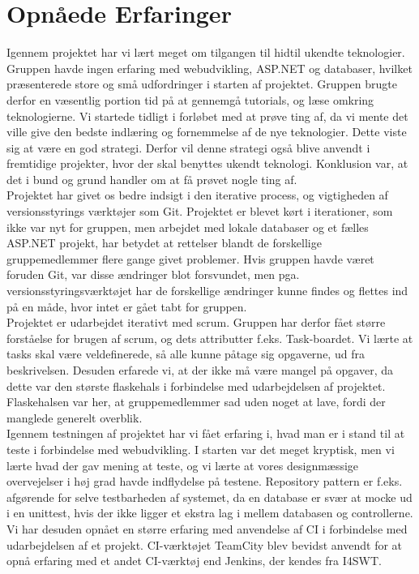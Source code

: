 \chapter{Opnåede Erfaringer}

Igennem projektet har vi lært meget om tilgangen til hidtil ukendte teknologier. Gruppen havde ingen erfaring med webudvikling, ASP.NET og databaser, hvilket præsenterede store og små udfordringer i starten af projektet. Gruppen brugte derfor en væsentlig portion tid på at gennemgå tutorials, og læse omkring teknologierne. Vi startede tidligt i forløbet med at prøve ting af, da vi mente det ville give den bedste indlæring og fornemmelse af de nye teknologier. Dette viste sig at være en god strategi. Derfor vil denne strategi også blive anvendt i fremtidige projekter, hvor der skal benyttes ukendt teknologi. Konklusion var, at det i bund og grund handler om at få prøvet nogle ting af.\\


\noindent Projektet har givet os bedre indsigt i den iterative process, og vigtigheden af versionsstyrings værktøjer som Git. Projektet er blevet kørt i iterationer, som ikke var nyt for gruppen, men arbejdet med lokale databaser og et fælles ASP.NET projekt, har betydet at rettelser blandt de forskellige gruppemedlemmer flere gange givet problemer. Hvis gruppen havde været foruden Git, var disse ændringer blot forsvundet, men pga. versionsstyringsværktøjet har de forskellige ændringer kunne findes og flettes ind på en måde, hvor intet er gået tabt for gruppen. \\

\noindent Projektet er udarbejdet iterativt med scrum. Gruppen har derfor fået større forståelse for brugen af scrum, og dets attributter f.eks. Task-boardet. Vi lærte at tasks skal være veldefinerede, så alle kunne påtage sig opgaverne, ud fra beskrivelsen. Desuden erfarede vi, at der ikke må være mangel på opgaver, da dette var den største flaskehals i forbindelse med udarbejdelsen af projektet. Flaskehalsen var her, at gruppemedlemmer sad uden noget at lave, fordi der manglede generelt overblik.\\

\noindent Igennem testningen af projektet har vi fået erfaring i, hvad man er i stand til at teste i forbindelse med webudvikling. I starten var det meget kryptisk, men vi lærte hvad der gav mening at teste, og vi lærte at vores designmæssige overvejelser i høj grad havde indflydelse på testene. Repository pattern er f.eks. afgørende for selve testbarheden af systemet, da en database er svær at mocke ud i en unittest, hvis der ikke ligger et ekstra lag i mellem databasen og controllerne.\\

\noindent Vi har desuden opnået en større erfaring med anvendelse af CI i forbindelse med udarbejdelsen af et projekt. CI-værktøjet TeamCity blev bevidst anvendt for at opnå erfaring med et andet CI-værktøj end Jenkins, der kendes fra I4SWT.


